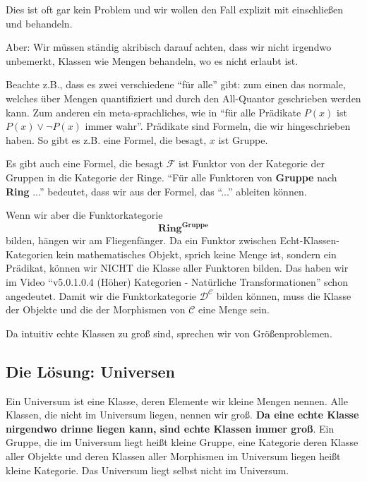 \documentclass[a4paper]{amsart}
\theoremstyle{definition}
\newcommand{\CC}{\ensuremath{\mathcal{ C }}}
\newcommand{\DD}{\ensuremath{\mathcal{ D }}}
\newcommand{\FF}{\ensuremath{\mathcal{ F }}}
\begin{document}
Dies ist oft gar kein Problem und wir wollen den Fall explizit mit einschließen und behandeln.

Aber: Wir müssen ständig akribisch darauf achten, dass wir nicht irgendwo unbemerkt, Klassen wie Mengen behandeln, wo es nicht erlaubt ist.

Beachte z.B., dass es zwei verschiedene "`für alle"' gibt: zum einen das normale, welches über Mengen quantifiziert und durch den All-Quantor geschrieben werden kann. Zum anderen ein meta-sprachliches, wie in "`für alle Prädikate $P(x)$ ist $P(x) \lor \neg P(x)$ immer wahr"'. Prädikate sind Formeln, die wir hingeschrieben haben. So gibt es z.B. eine Formel, die besagt, $x$ ist Gruppe.

Es gibt auch eine Formel, die besagt $\FF$ ist Funktor von der Kategorie der Gruppen in die Kategorie der Ringe. "`Für alle Funktoren von \textbf{Gruppe} nach \textbf{Ring} ..."' bedeutet, dass wir aus der Formel, das "`..."' ableiten können.

Wenn wir aber die Funktorkategorie
\begin{equation}
    \mathbf{Ring}^\mathbf{Gruppe}
\end{equation}
bilden, hängen wir am Fliegenfänger. Da ein Funktor zwischen Echt-Klassen-Kategorien kein mathematisches Objekt, sprich keine Menge ist, sondern ein Prädikat, können wir NICHT die Klasse aller Funktoren bilden. Das haben wir im Video "`v5.0.1.0.4 (Höher) Kategorien - Natürliche Transformationen"' schon angedeutet.
Damit wir die Funktorkategorie $\DD^\CC$ bilden können, muss die Klasse der Objekte und die der Morphismen von $\CC$ eine Menge sein.

Da intuitiv echte Klassen zu groß sind, sprechen wir von Größenproblemen.

\subsection{Die Lösung: Universen}
Ein Universum ist eine Klasse, deren Elemente wir kleine Mengen nennen. Alle Klassen, die nicht im Universum liegen, nennen wir groß. \textbf{Da eine echte Klasse nirgendwo drinne liegen kann, sind echte Klassen immer groß}. Ein Gruppe, die im Universum liegt heißt kleine Gruppe, eine Kategorie deren Klasse aller Objekte und deren Klassen aller Morphismen im Universum liegen heißt kleine Kategorie. Das Universum liegt selbst nicht im Universum.
\end{document}
